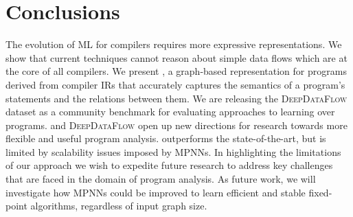 \section{Conclusions}

The evolution of ML for compilers requires more expressive representations. We
show that current techniques cannot reason about simple data flows which are at
the core of all compilers. We present \programl, a graph-based representation
for programs derived from compiler IRs that accurately captures the semantics of
a program's statements and the relations between them. We are releasing the
\textsc{DeepDataFlow} dataset as a community benchmark for evaluating approaches
to learning over programs. \programl and \textsc{DeepDataFlow} open up new
directions for research towards more flexible and useful program analysis.
\programl outperforms the state-of-the-art, but is limited by scalability issues
imposed by MPNNs. In highlighting the limitations of our approach we wish to
expedite future research to address key challenges that are faced in the domain
of program analysis. As future work, we will investigate how MPNNs could be
improved to learn efficient and stable fixed-point algorithms, regardless of
input graph size.
